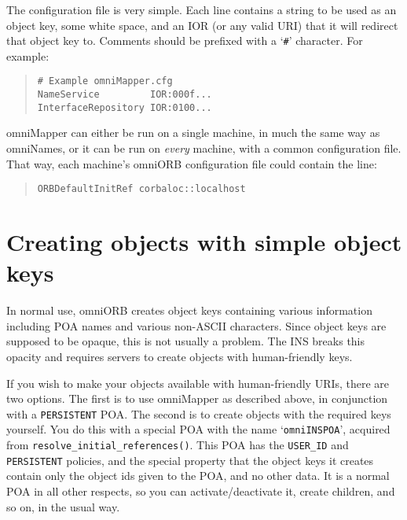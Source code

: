 \documentclass[11pt,twoside,a4paper]{book}
\newcommand{\code}[1]{\texttt{#1}}
\newcommand{\op}[1]{\texttt{#1()}}
\begin{document}
The configuration file is very simple. Each line contains a string to
be used as an object key, some white space, and an IOR (or any valid
URI) that it will redirect that object key to. Comments should be
prefixed with a `\texttt{\#}' character. For example:

\begin{quote}
\begin{verbatim}
# Example omniMapper.cfg
NameService         IOR:000f...
InterfaceRepository IOR:0100...
\end{verbatim}
\end{quote}

omniMapper can either be run on a single machine, in much the same way
as omniNames, or it can be run on \emph{every} machine, with a common
configuration file. That way, each machine's omniORB configuration
file could contain the line:

\begin{quote}
\begin{verbatim}
ORBDefaultInitRef corbaloc::localhost
\end{verbatim}
\end{quote}



\section{Creating objects with simple object keys}

In normal use, omniORB creates object keys containing various
information including POA names and various non-ASCII characters.
Since object keys are supposed to be opaque, this is not usually a
problem. The INS breaks this opacity and requires servers to create
objects with human-friendly keys.

If you wish to make your objects available with human-friendly URIs,
there are two options. The first is to use omniMapper as described
above, in conjunction with a \code{PERSISTENT} POA. The second is to
create objects with the required keys yourself. You do this with a
special POA with the name `\texttt{omniINSPOA}', acquired from
\op{resolve\_initial\_references}. This POA has the \code{USER\_ID}
and \code{PERSISTENT} policies, and the special property that the
object keys it creates contain only the object ids given to the POA,
and no other data. It is a normal POA in all other respects, so you
can activate/deactivate it, create children, and so on, in the usual
way.
\end{document}
